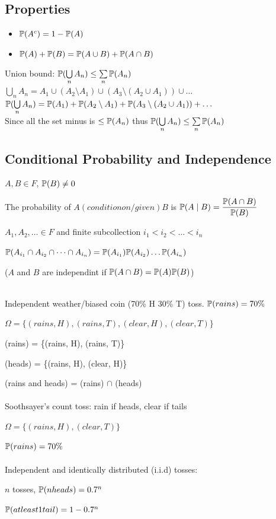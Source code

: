 \subsection*{Properties}
\begin{itemize}
    \item $\P(A^c)=1-\P(A)$
    \item $\P(A)+\P(B)=\P(A\cup B)+\P(A \cap B)$
\end{itemize}

\begin{example}
    Union bound: $\P(\bigcup\limits_n A_n) \leq \sum\limits_n \P(A_n)$\\
    $\bigcup\limits_n A_n = A_1 \cup (A_2\setminus A_1)\cup(A_3\setminus(A_2\cup A_1))\cup\dots$\\
    $\P(\bigcup\limits_n A_n) = \P(A_1)+\P(A_2\setminus A_1)+\P(A_3\setminus(A_2 \cup A_1))+\dots$\\
    Since all the set minus is $\leq \P(A_n)$ thus $\P(\bigcup\limits_n A_n) \leq \sum\limits_n \P(A_n)$
\end{example}

\subsection*{Conditional Probability and Independence}
\begin{definition}
    $A,B\in F$, $\P(B)\neq 0$

    The probability of $A (condition on/given) B$ is $\P(A \mid B)=\dfrac{\P(A\cap B)}{\P(B)}$
\end{definition}

\begin{definition}
    $A_1,A_2,\dots \in F$ and finite subcollection $i_1<i_2<\dots<i_n$

    $\P(A_{i_1}\cap A_{i_2} \cap \dots \cap A_{i_n})=\P(A_{i_1})\P(A_{i_2})\dots\P(A_{i_n})$

    ($A$ and $B$ are independint if $\P(A \cap B)= \P(A)\P(B)$)
\end{definition}

\begin{example}
    \phantom{text}\\
    Independent weather/biased coin (70\% H 30\% T) toss. $\P(rains)=70\%$

    $\Omega = \{ (rains, H), (rains, T), (clear, H), (clear, T)\}$

    (rains) = \{(rains, H), (rains, T)\}

    (heads) = \{(rains, H), (clear, H)\}

    (rains and heads) = (rains) $\cap$ (heads)\\\\
    Soothsayer's count toss: rain if heads, clear if tails

    $\Omega = \{(rains, H), (clear, T)\}$

    $\P(rains)=70\%$\\\\
    Independent and identically distributed (i.i.d) tosses:

    $n$ tosses, $\P(n heads)=0.7^{n}$

    $\P(at least 1 tail)=1-0.7^{n}$
\end{example}

